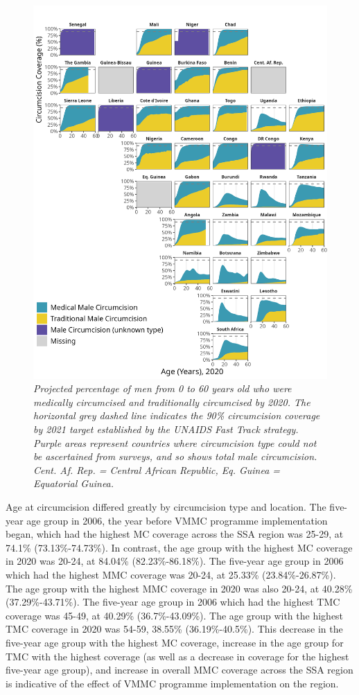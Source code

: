 \documentclass{article}
\begin{document}
\begin{figure}[H]
    \centering
    \includegraphics[width=.9\linewidth]
    {figures/paper/03_geo_age.png}
    \caption{\emph{Projected percentage of men from 0 to 60 years old who were medically circumcised and traditionally circumcised by 2020. The horizontal grey dashed line indicates the 90\% circumcision coverage by 2021 target established by the UNAIDS Fast Track strategy. Purple areas represent countries where circumcision type could not be ascertained from surveys, and so shows total male circumcision. Cent. Af. Rep. = Central African Republic, Eq. Guinea = Equatorial Guinea.}}
\end{figure}

Age at circumcision differed greatly by circumcision type and location. The five-year age group in 2006, the year before VMMC programme implementation began, which had the highest MC coverage across the SSA region was 25-29, at 74.1\% (73.13\%-74.73\%). 
In contrast, the age group with the highest MC coverage in 2020 was 20-24, at 84.04\% (82.23\%-86.18\%). The five-year age group in 2006 which had the highest MMC coverage was 20-24, at 25.33\% (23.84\%-26.87\%). 
The age group with the highest MMC coverage in 2020 was also 20-24, at 40.28\% (37.29\%-43.71\%). The five-year age group in 2006 which had the highest
TMC coverage was 45-49, at 40.29\% (36.7\%-43.09\%). The age group with the highest TMC coverage in
2020 was 54-59, 38.55\% (36.19\%-40.5\%). This decrease in the five-year age group with the highest MC coverage, increase in the age group for TMC with the highest coverage (as well as a decrease in coverage for
the highest five-year age group), and increase in overall MMC coverage across the SSA region is indicative of
the effect of VMMC programme implementation on the region.
\end{document}
